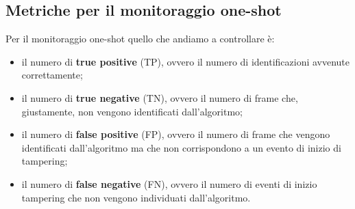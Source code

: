 \subsection{Metriche per il monitoraggio one-shot}
Per il monitoraggio one-shot quello che andiamo a controllare \`e:
\begin{itemize}
	\item il numero di \textbf{true positive} (TP), ovvero il numero di identificazioni avvenute correttamente;
	\item il numero di \textbf{true negative} (TN), ovvero il numero di frame che, giustamente, non vengono identificati dall'algoritmo;
	\item il numero di \textbf{false positive} (FP), ovvero il numero di frame che vengono identificati dall'algoritmo ma che non corrispondono a un evento di inizio di tampering;
	\item il numero di \textbf{false negative} (FN), ovvero il numero di eventi di inizio tampering che non vengono individuati dall'algoritmo.
\end{itemize}

